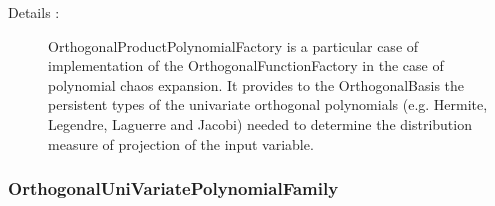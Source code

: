 \begin{description}
\begin{description}
  \end{description}
\item[Details :] OrthogonalProductPolynomialFactory is a particular case of implementation of the OrthogonalFunctionFactory in the case of polynomial chaos expansion. It provides to the OrthogonalBasis the persistent types of the univariate orthogonal polynomials (e.g. Hermite, Legendre, Laguerre and Jacobi) needed to determine the distribution measure of projection of the input variable.

\end{description}







\newpage
\subsubsection{OrthogonalUniVariatePolynomialFamily}


